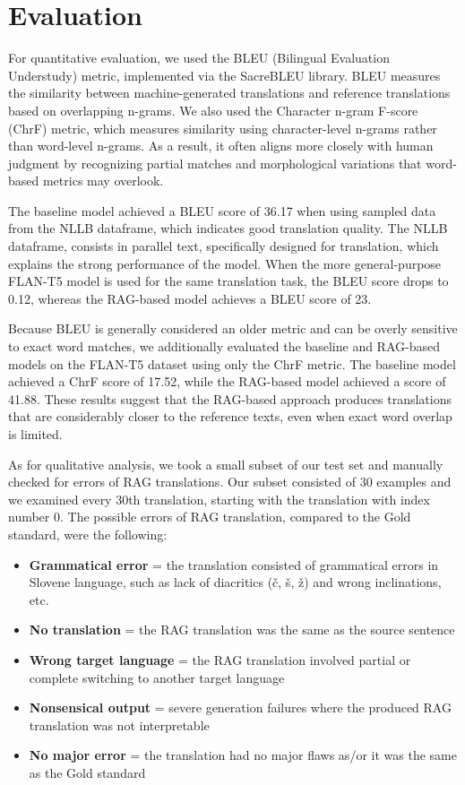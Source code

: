 \documentclass[fleqn,moreauthors,10pt]{ds_report}
\begin{document}
\section*{Evaluation}

For quantitative evaluation, we used the BLEU (Bilingual Evaluation Understudy) metric, implemented via the SacreBLEU library. BLEU measures the similarity between machine-generated translations and reference translations based on overlapping n-grams.
We also used the Character n-gram F-score (ChrF) metric, which measures similarity using character-level n-grams rather than word-level n-grams. As a result, it often aligns more closely with human judgment by recognizing partial matches and morphological variations that word-based metrics may overlook.


The baseline model achieved a BLEU score of 36.17 when using sampled data from the NLLB dataframe, which indicates good translation quality. The NLLB dataframe, consists in parallel text, specifically designed for translation, which explains the strong performance of the model. 
When the more general-purpose FLAN-T5 model is used for the same translation task, the BLEU score drops to 0.12, whereas the RAG-based model achieves a BLEU score of 23.


Because BLEU is generally considered an older metric and can be overly sensitive to exact word matches, we additionally evaluated the baseline and RAG-based models on the FLAN-T5 dataset using only the ChrF metric. The baseline model achieved a ChrF score of 17.52, while the RAG-based model achieved a score of 41.88. These results suggest that the RAG-based approach produces translations that are considerably closer to the reference texts, even when exact word overlap is limited.


As for qualitative analysis, we took a small subset of our test set and manually checked for errors of RAG translations. Our subset consisted of 30 examples and we examined every 30th translation, starting with the translation with index number 0. The possible errors of RAG translation, compared to the Gold standard, were the following:

\begin{itemize}
    \item \textbf{Grammatical error} = the translation consisted of grammatical errors in Slovene language, such as lack of diacritics (č, š, ž) and wrong inclinations, etc. 
    \item \textbf{No translation} = the RAG translation was the same as the source sentence
    \item \textbf{Wrong target language} = the RAG translation involved partial or complete switching to another target language 
    \item \textbf{Nonsensical output} =  severe generation failures where the produced RAG translation was not interpretable
    \item \textbf{No major error} = the translation had no major flaws as/or it was the same as the Gold standard
\end{itemize}
\end{document}
